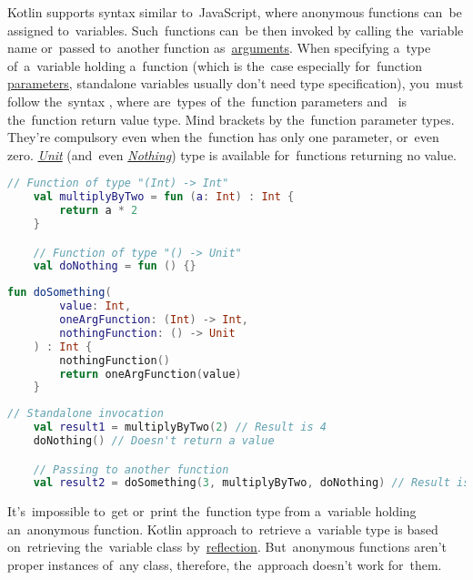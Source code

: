 \label{kotlinanonymousfunction}
Kotlin supports syntax similar to~JavaScript, where anonymous functions can~be assigned to~variables.
Such~functions can~be then invoked by calling the~variable name or~passed to~another function as~\hyperref[parameterargument]{arguments}.
When specifying a~type of~a~variable holding a~function (which is the~case especially for~function \hyperref[parameterargument]{parameters}, standalone variables usually don't need type specification), you~must follow the~syntax , where  are~types of~the~function parameters \mbox{and } is the~function return value type.
Mind brackets by the~function parameter types.
They're compulsory even when the~function has only one parameter, or~even zero.
\hyperref[kotlinunit]{\textit{Unit}} (and~even \hyperref[kotlinnothing]{\textit{Nothing}}) type is available for~functions returning no value.

\example
\begin{lstlisting}[language=Kotlin]
    // Function of type "(Int) -> Int"
    val multiplyByTwo = fun (a: Int) : Int {
        return a * 2
    }

    // Function of type "() -> Unit"
    val doNothing = fun () {}
\end{lstlisting}
\begin{lstlisting}[language=Kotlin, title={Function taking other functions as parameters}]
    fun doSomething(
        value: Int,
        oneArgFunction: (Int) -> Int,
        nothingFunction: () -> Unit
    ) : Int {
        nothingFunction()
        return oneArgFunction(value)
    }
\end{lstlisting}
\newpage

\begin{lstlisting}[language=Kotlin, title={Usage}]
    // Standalone invocation
    val result1 = multiplyByTwo(2) // Result is 4
    doNothing() // Doesn't return a value

    // Passing to another function
    val result2 = doSomething(3, multiplyByTwo, doNothing) // Result is 6
\end{lstlisting}

\warning It's~impossible to~get or~print the~function type from a~variable holding an~anonymous function.
Kotlin approach to~retrieve a~variable type is based on~retrieving the~variable class by~\hyperref[kotlinreflection]{reflection}.
But~anonymous functions aren't proper instances of~any class, therefore, the~approach doesn't work for~them.

